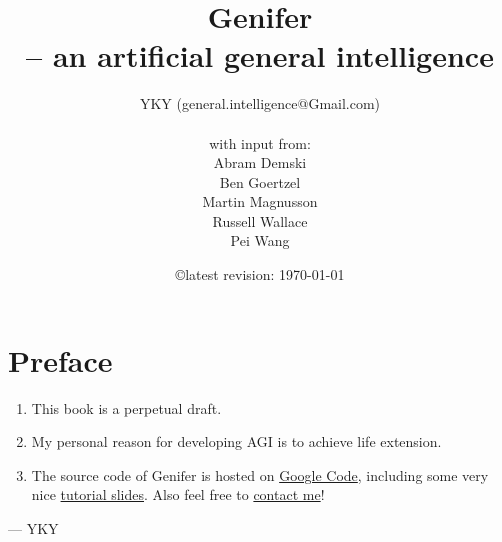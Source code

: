 \message{ !name(AGI-book.tex)}\documentclass[12pt, a4paper]{report}
\title{\textbf{Genifer\\-- an artificial general intelligence}}
\author{YKY (general.intelligence@Gmail.com)\\ \\
with input from:\\
Abram Demski\\
Ben Goertzel\\
Martin Magnusson\\
Russell Wallace\\
Pei Wang
}
\date{\copyright \quad latest revision: \today}
\begin{document}
\chapter{Preface}

\begin{enumerate}

$\pi = 1$

\item  This book is a perpetual draft.

\item  My personal reason for developing AGI is to achieve life extension.

\item  The source code of $\mbox{Genifer}$ is hosted on \href{http://code.google.com/p/genifer/}{Google Code}, including some very nice \href{http://code.google.com/p/genifer/downloads/list}{tutorial slides}.  Also feel free to \href{mailto:Generic.Intelligence@Gmail.com}{contact me}!

\end{enumerate}

\begin{flushright}
--- YKY
\end{flushright}






















\clearpage
{}
{}

\end{document}
